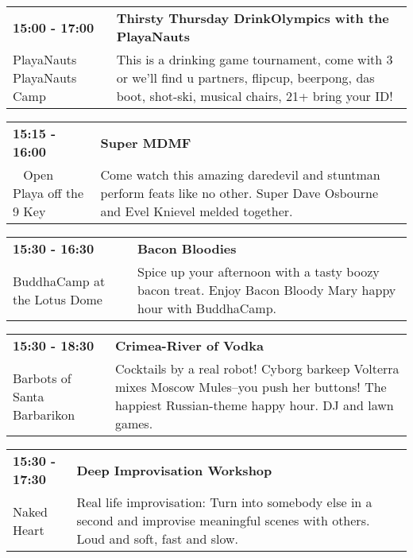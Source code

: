 \begin{tabular}{ p{1in} p{2.2in} }
    \textbf{15:00 - 17:00} & \textbf{Thirsty Thursday DrinkOlympics with the PlayaNauts} \\
    PlayaNauts \newline PlayaNauts Camp & This is a drinking game tournament, come with 3 or we'll find u partners, flipcup, beerpong, das boot, shot-ski, musical chairs, 21+ bring your ID! \\
    \hline 
\end{tabular}
    
\begin{tabular}{ p{1in} p{2.2in} }
    \textbf{15:15 - 16:00} & \textbf{Super MDMF} \\
    ~ \newline Open Playa off the 9 Key & Come watch this amazing daredevil and stuntman perform feats like no other.  Super Dave Osbourne and Evel Knievel melded together. \\
    \hline 
\end{tabular}
    
\begin{tabular}{ p{1in} p{2.2in} }
    \textbf{15:30 - 16:30} & \textbf{Bacon Bloodies} \\
    BuddhaCamp at the Lotus Dome \newline  & Spice up your afternoon with a tasty boozy bacon treat.  Enjoy Bacon Bloody Mary happy hour with BuddhaCamp. \\
    \hline 
\end{tabular}
    
\begin{tabular}{ p{1in} p{2.2in} }
    \textbf{15:30 - 18:30} & \textbf{Crimea-River of Vodka} \\
    Barbots of Santa Barbarikon \newline  & Cocktails by a real robot! Cyborg barkeep Volterra mixes Moscow Mules--you push her buttons! The happiest Russian-theme happy hour. DJ and lawn games. \\
    \hline 
\end{tabular}
    
\begin{tabular}{ p{1in} p{2.2in} }
    \textbf{15:30 - 17:30} & \textbf{Deep Improvisation Workshop} \\
    Naked Heart \newline  & Real life improvisation: Turn into somebody else in a second and improvise meaningful scenes with others. Loud and soft, fast and slow. \\
    \hline 
\end{tabular}
    
